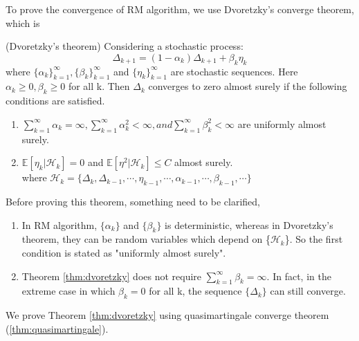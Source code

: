   To prove the convergence of RM algorithm, we use Dvoretzky's converge theorem, which is
  \begin{theorem}{(Dvoretzky's theorem)}
    \label{thm:dvoretzky}
    Considering a stochastic process:
    \begin{equation*}
      \Delta_{k+1} = \left(1-\alpha_k\right)\Delta_{k+1}+\beta_k\eta_k
    \end{equation*}
    where \( \{\alpha_k \}_{k=1}^{\infty}, \{\beta_k\}_{k=1}^{\infty} \) and \( \{\eta_k\}_{k=1}^{\infty} \) are
    stochastic sequences. Here \( \alpha_k \ge 0, \beta_k \ge 0 \) for all k. Then \( \Delta_k \) converges to zero almost
    surely if the following conditions are satisfied.
    \begin{enumerate}[label=\alph*)]
      \item
            \( \sum_{k=1}^{\infty} \alpha_k =\infty, \sum_{k=1}^{\infty} \alpha_{k}^{2}< \infty, and \sum_{k=1}^{\infty}
            \beta_k^{2}<\infty\) are uniformly almost surely.
      \item
            $\mathbb{E}[\eta_{k}|\mathcal{H}_{k}]=0$ and $\mathbb{E}[\eta^{2}|\mathcal{H}_{k}] \le C$ almost surely.\\ where
            $\mathcal{H}_{k}=\{\Delta_k,\Delta_{k-1},\cdots,\eta_{k-1},\cdots,\alpha_{k-1},\cdots,\beta_{k-1},\cdots\}$
    \end{enumerate}
  \end{theorem}
  Before proving this theorem, something need to be clarified,
  \begin{enumerate}

    \item
          In RM algorithm, $\{\alpha_{k}\}$ and $\{\beta_{k}\}$ is deterministic, whereas in Dvoretzky's theorem, they can be
          random variables which depend on \{$\mathcal{H}_{k}$\}. So the first condition is stated as "uniformly almost surely".
    \item
          Theorem \ref{thm:dvoretzky} does not require $\sum_{k=1}^{\infty} \beta_{k}=\infty$. In fact, in the extreme case in
          which $\beta_{k}=0$ for all k, the sequence $\{\Delta_{k}\}$ can still converge.

  \end{enumerate}
  We prove Theorem \ref{thm:dvoretzky} using quasimartingale converge theorem (\ref{thm:quasimartingale}).
